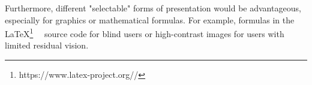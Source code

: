 Furthermore, different "selectable" forms of presentation would be advantageous, especially for graphics or mathematical formulas. For example, formulas in the \LaTeX\footnote{https://www.latex-project.org//} $\mbox{ }$ source code for blind users or high-contrast images for users with limited residual vision. 


